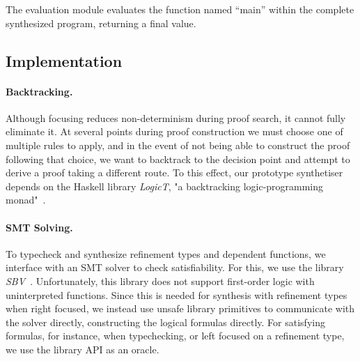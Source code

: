 \documentclass{llncs}
\newcommand{\mypara}[1]{\paragraph{\textbf{#1}.}}
\begin{document}
The evaluation module evaluates the function named ``main'' within the
complete synthesized program, returning a final value.




\subsection{Implementation}


\mypara{Backtracking} Although focusing reduces non-determinism
during proof search, it cannot fully eliminate it. At several points
during proof construction we must choose one of multiple rules to
apply, and in the event of not being able to construct the proof
following that choice, we want to backtrack to the decision point and
attempt to derive a proof taking a different route. To this effect,
our prototype synthetiser depends on the Haskell library \emph{LogicT}, "a backtracking
logic-programming monad"~\cite{logict}.

\mypara{SMT Solving} To typecheck and synthesize refinement types and
dependent functions, we interface with an SMT solver to check
satisfiability. For this, we use the library
\emph{SBV}~\cite{sbv}. Unfortunately, this library does not support
first-order logic with uninterpreted
functions. Since this is needed for synthesis with refinement types
when right focused, we instead use unsafe library primitives to
communicate with the solver directly, constructing the logical
formulas directly. For satisfying formulas, for instance, when
typechecking, or left focused on a refinement type, we use the library
API as an oracle.
\end{document}
